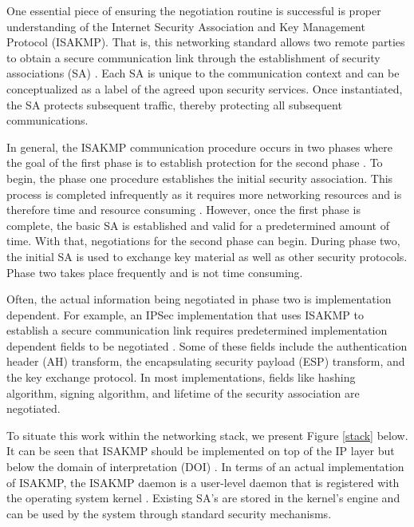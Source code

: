 \documentclass[12pt, letterpaper, twoside]{article}
\begin{document}
One essential piece of ensuring the negotiation routine is successful is proper understanding of the Internet Security Association and Key Management Protocol (ISAKMP). That is, this networking standard allows two remote parties to obtain a secure communication link through the establishment of security associations (SA) \cite{ISAKMP}. Each SA is unique to the communication context and can be conceptualized as a label of the agreed upon security services. Once instantiated, the SA protects subsequent traffic, thereby protecting all subsequent communications. 

In general, the ISAKMP communication procedure occurs in two phases where the goal of the first phase is to establish protection for the second phase \cite{ISAKMP}. To begin, the phase one procedure establishes the initial security association. This process is completed infrequently as it requires more networking resources and is therefore time and resource consuming \cite{ISAKMP}. However, once the first phase is complete, the basic SA is established and valid for a predetermined amount of time. With that, negotiations for the second phase can begin. During phase two, the initial SA is used to exchange key material as well as other security protocols. Phase two takes place frequently and is not time consuming.

Often, the actual information being negotiated in phase two is implementation dependent. For example, an IPSec implementation that uses ISAKMP to establish a secure communication link requires predetermined implementation dependent fields to be negotiated \cite{rfc_doi}. Some of these fields include the authentication header (AH) transform, the encapsulating security payload (ESP) transform, and the key exchange protocol. In most implementations, fields like hashing algorithm, signing algorithm, and lifetime of the security association are negotiated.  


To situate this work within the networking stack, we present Figure \ref{stack} below. It can be seen that ISAKMP should be implemented on top of the IP layer but below the domain of interpretation (DOI) \cite{thesis}. In terms of an actual implementation of ISAKMP, the ISAKMP daemon is a user-level daemon that is registered with the operating system kernel \cite{thesis}. Existing SA's are stored in the kernel's engine and can be used by the system through standard security mechanisms.
\end{document}
